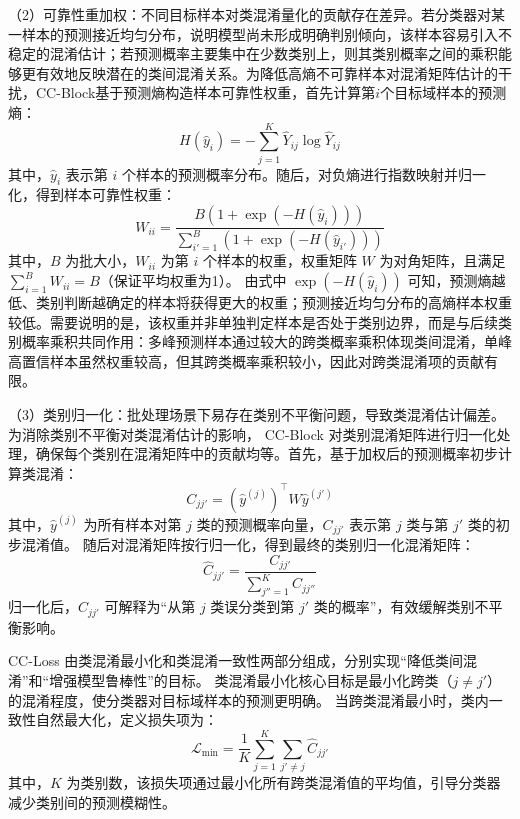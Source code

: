 （2）可靠性重加权：不同目标样本对类混淆量化的贡献存在差异。若分类器对某一样本的预测接近均匀分布，说明模型尚未形成明确判别倾向，该样本容易引入不稳定的混淆估计；若预测概率主要集中在少数类别上，则其类别概率之间的乘积能够更有效地反映潜在的类间混淆关系。为降低高熵不可靠样本对混淆矩阵估计的干扰，CC-Block基于预测熵构造样本可靠性权重，首先计算第$i$个目标域样本的预测熵：
\begin{equation}
H(\hat{y}_i) = -\sum_{j=1}^{K} \hat{Y}_{ij} \log \hat{Y}_{ij}
\end{equation}
其中，$\hat{y}_i$ 表示第 $i$ 个样本的预测概率分布。随后，对负熵进行指数映射并归一化，得到样本可靠性权重：
\begin{equation}
W_{ii} = \frac{B\left(1 + \exp\left(-H(\hat{y}_i)\right)\right)}{\sum_{i'=1}^{B} \left(1 + \exp\left(-H(\hat{y}_{i'})\right)\right)}
\end{equation}
其中，$B$ 为批大小，$W_{ii}$ 为第 $i$ 个样本的权重，权重矩阵 $W$ 为对角矩阵，且满足 $\sum_{i=1}^{B} W_{ii}=B$（保证平均权重为1）。
由式中 $\exp(-H(\hat{y}_i))$ 可知，预测熵越低、类别判断越确定的样本将获得更大的权重；预测接近均匀分布的高熵样本权重较低。需要说明的是，该权重并非单独判定样本是否处于类别边界，而是与后续类别概率乘积共同作用：多峰预测样本通过较大的跨类概率乘积体现类间混淆，单峰高置信样本虽然权重较高，但其跨类概率乘积较小，因此对跨类混淆项的贡献有限。

（3）类别归一化：批处理场景下易存在类别不平衡问题，导致类混淆估计偏差。为消除类别不平衡对类混淆估计的影响，
CC-Block 对类别混淆矩阵进行归一化处理，确保每个类别在混淆矩阵中的贡献均等。首先，基于加权后的预测概率初步计算类混淆：
\begin{equation}
C_{jj'} = (\hat{y}^{(j)})^{\top} W \hat{y}^{(j')}
\end{equation}
其中，$\hat{y}^{(j)}$ 为所有样本对第 $j$ 类的预测概率向量，$C_{jj'}$ 表示第 $j$ 类与第 $j'$ 类的初步混淆值。
随后对混淆矩阵按行归一化，得到最终的类别归一化混淆矩阵：
\begin{equation}
\hat{C}_{jj'} = \frac{C_{jj'}}{\sum_{j''=1}^{K} C_{jj''}}
\end{equation}
归一化后，$\hat{C}_{jj'}$ 可解释为“从第 $j$ 类误分类到第 $j'$ 类的概率”，有效缓解类别不平衡影响。

CC-Loss 由类混淆最小化和类混淆一致性两部分组成，分别实现“降低类间混淆”和“增强模型鲁棒性”的目标。
类混淆最小化核心目标是最小化跨类（$j \neq j'$）的混淆程度，使分类器对目标域样本的预测更明确。
当跨类混淆最小时，类内一致性自然最大化，定义损失项为：
\begin{equation}
\mathcal{L}_{\text{min}} = \frac{1}{K} \sum_{j=1}^{K} \sum_{j' \neq j} \hat{C}_{jj'}
\end{equation}
其中，$K$ 为类别数，该损失项通过最小化所有跨类混淆值的平均值，引导分类器减少类别间的预测模糊性。

